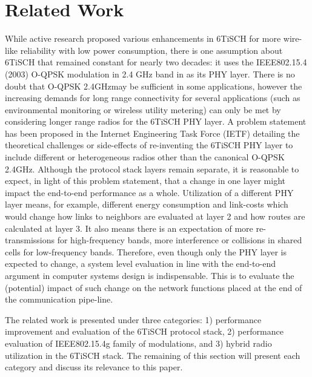 \documentclass[journal]{IEEEtran}
\newcommand{\oqpsk}        {O-QPSK 2.4GHz}
\begin{document}
\section{Related Work}
\label{sec:related_work}


While active research proposed various enhancements in 6TiSCH  for more wire-like reliability with low power consumption, there is one assumption about 6TiSCH that remained constant for nearly two decades: it uses the IEEE802.15.4 (2003) O-QPSK modulation in 2.4 GHz band in as its PHY layer. 
There is no doubt that \oqpsk may be sufficient in some applications, however the increasing demands for long range connectivity for several applications (such as environmental monitoring or wireless utility metering) can only be met by considering longer range radios for the 6TiSCH PHY layer.
A problem statement has been proposed in the Internet Engineering Task Force (IETF) detailing the theoretical challenges or side-effects of re-inventing the 6TiSCH PHY layer to include different or heterogeneous radios other than the canonical \oqpsk \cite{j.munoz18problem}. 
Although the protocol stack layers remain separate, it is reasonable to expect, in light of this problem statement, that a change in one layer might impact the end-to-end performance as a whole. 
Utilization of a different PHY layer means, for example, different energy consumption and link-costs which would change how links to neighbors are evaluated at layer 2 and how routes are calculated at layer 3.
It also means there is an expectation of more re-transmissions for high-frequency bands, more interference or collisions in shared cells for low-frequency bands.
Therefore, even though only the PHY layer is expected to change, a system level evaluation in line with the end-to-end argument in computer systems design \cite{saltzer84endtoend} is indispensable.
This is to evaluate the (potential) impact of such change on the network functions placed at the end of the communication pipe-line. 

The related work is presented under three categories: 
    1) performance improvement and evaluation of the 6TiSCH protocol stack,
    2) performance evaluation of IEEE802.15.4g family of modulations, and
    3) hybrid radio utilization in the 6TiSCH stack. 
The remaining of this section will present each category and discuss its relevance to this paper.
\end{document}
